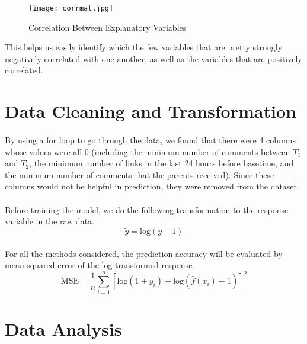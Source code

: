 \documentclass[paper=a4, fontsize=11pt]{scrartcl} %
\numberwithin{equation}{section} %
\numberwithin{figure}{section} %
\numberwithin{table}{section} %
\begin{document}
\begin{figure}[H]
    \centering
        \texttt{[image: corrmat.jpg]} 
        \caption{Correlation Between Explanatory Variables}
\end{figure}

This helps us easily identify which the few variables that are pretty strongly negatively correlated with one another, as well as the variables that are positively correlated.


\section{Data Cleaning and Transformation}
\paragraph{}
 By using a for loop to go through the data, we found that there were 4 columns whose values were all 0 (including the minimum number of comments between \(T_1\) and \(T_2\), the minimum number of links in the last 24 hours before basetime, and the minimum number of comments that the parents received). Since these columns would not be helpful in prediction, they were removed from the dataset.

\paragraph{}
 Before training the model, we do the following transformation to the response variable in the raw data.
\[\tilde{y} = \text{log}(y+1)\]

\paragraph{}
 For all the methods considered, the prediction accuracy will be evaluated by mean squared error of the log-transformed response.
\[\text{MSE} = \dfrac{1}{n} \sum_{i=1}^{n} [\text{log} (1+y_i) - \text{log}(\hat{f}(x_i)+1)]^2\]


\section{Data Analysis}
\end{document}
